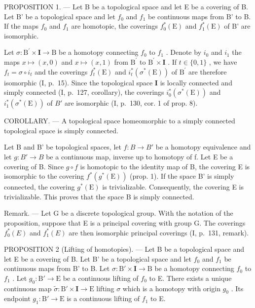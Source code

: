 PROPOSITION 1. --- Let B be a topological space and let E be a covering of B. Let B' be a topological space and let \(f_0\) and \(f_1\) be continuous maps from B' to B. If the maps \(f_0\) and \(f_1\) are homotopic, the coverings \(f_0^*(\mathrm{E})\) and \(f_1^*(\mathrm{E})\) of B' are isomorphic.

Let \(\sigma\colon\mathrm{B}^{\prime}\times\mathbf{I}\to\mathrm{B}\) be a homotopy connecting \(f_{0}\) to \(f_{1}\) . Denote by \(i_{0}\) and \(i_{1}\) the maps \(x\mapsto(x,0)\) and \(x\mapsto(x,1)\) from \(\mathrm{B}^{\prime}\) to \(\mathrm{B}^{\prime}\times\mathbf{I}\) . If \(t\in\{0,1\}\) , we have \(f_{t}=\sigma\circ i_{t}\) and the coverings \(f_{t}^{*}(\mathrm{E})\) and \(i_{t}^{*}(\sigma^{*}(\mathrm{E}))\) of \(\mathrm{B}^{\prime}\) are therefore isomorphic (I, p.~15). Since the topological space \(\mathbf{I}\) is locally connected and simply connected (I, p.~127, corollary), the coverings \(i_{0}^{*}(\sigma^{*}(\mathrm{E}))\) and \(i_{1}^{*}(\sigma^{*}(\mathrm{E}))\) of \(B'\) are isomorphic (I, p.~130, cor. 1 of prop. 8).

COROLLARY. --- A topological space homeomorphic to a simply connected topological space is simply connected.

Let B and B' be topological spaces, let \(f: B \rightarrow B'\) be a homotopy equivalence and let \(g: B' \rightarrow B\) be a continuous map, inverse up to homotopy of f. Let E be a covering of B. Since \(g \circ f\) is homotopic to the identity map of B, the covering E is isomorphic to the covering \(f^{*}(g^{*}(\mathrm{E}))\) (prop. 1). If the space B' is simply connected, the covering \(g^{*}(\mathrm{E})\) is trivializable. Consequently, the covering E is trivializable. This proves that the space B is simply connected.

Remark. --- Let G be a discrete topological group. With the notation of the proposition, suppose that E is a principal covering with group G. The coverings \(f_{0}^{*}(E)\) and \(f_{1}^{*}(E)\) are then isomorphic principal coverings (I, p.~131, remark).

PROPOSITION 2 (Lifting of homotopies). --- Let B be a topological space and let E be a covering of B. Let B' be a topological space and let \(f_0\) and \(f_1\) be continuous maps from B' to B. Let \(\sigma: \mathrm{B}' \times \mathbf{I} \to \mathrm{B}\) be a homotopy connecting \(f_0\) to \(f_1\) . Let \(g_0: \mathrm{B}' \to \mathrm{E}\) be a continuous lifting of \(f_0\) to E. There exists a unique continuous map \(\widetilde{\sigma}: \mathrm{B}' \times \mathbf{I} \to \mathrm{E}\) lifting \(\sigma\) which is a homotopy with origin \(g_0\) . Its endpoint \(g_1: \mathrm{B}' \to \mathrm{E}\) is a continuous lifting of \(f_1\) to E.


